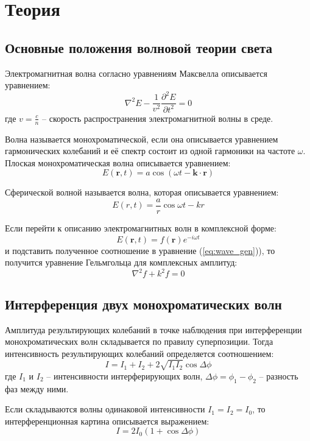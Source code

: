 \section*{Теория}

\subsection*{Основные положения волновой теории света}

Электромагнитная волна согласно уравнениям Максвелла описывается уравнением:
\begin{equation}
\nabla^2 E - \frac{1}{v^2} \frac{\partial^2 E}{\partial t^2} = 0
\label{eq:wave_gen}
\end{equation}
где $v = \frac{c}{n}$ -- скорость распространения электромагнитной волны в 
среде.

Волна называется монохроматической, если она описывается уравнением 
гармонических колебаний и её спектр состоит из одной гармоники на частоте 
$\omega$. Плоская монохроматическая волна описывается уравнением:
$$
E(\boldsymbol{r}, t) = a \cos \left( \omega t - \boldsymbol{k} \cdot 
\boldsymbol{r} \right)
$$

Сферической волной называется волна, которая описывается уравнением:
$$
E(r, t) = \frac{a}{r} \cos{\omega t - k r}
$$

Если перейти к описанию электромагнитных волн в комплексной форме:
$$
E(\boldsymbol{r}, t) = f(\boldsymbol{r}) e^{-i \omega t}
$$
и подставить полученное соотношение в уравнение (\ref{eq:wave_gen})), то 
получится уравнение Гельмгольца для комплексных амплитуд:
$$
\nabla^2 f + k^2 f = 0
$$

\subsection*{Интерференция двух монохроматических волн}

Амплитуда результирующих колебаний в точке наблюдения при интерференции 
монохроматических волн складывается по правилу суперпозиции. Тогда 
интенсивность результирующих колебаний определяется соотношением:
$$
I = I_1 + I_2 + 2 \sqrt{I_1 I_2} \cos \Delta \phi
$$
где $I_1$ и $I_2$ -- интенсивности интерферирующих волн, $\Delta \phi = \phi_1 
- \phi_2$ -- разность фаз между ними.

Если складываются волны одинаковой интенсивности $I_1 = I_2 = I_0$, то 
интерференционная картина описывается выражением:
$$
I = 2 I_0 \left( 1 + \cos \Delta \phi \right)
$$

